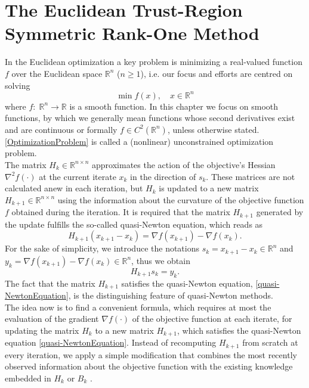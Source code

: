 \chapter{The Euclidean Trust-Region Symmetric Rank-One Method}

In the Euclidean optimization a key problem is minimizing a real-valued function $f$ over the Euclidean space $\mathbb{R}^n$ ($n \geq 1$), i.e. our focus and efforts are centred on solving 
\begin{equation}\label{OptimizationProblem}
    \min f(x), \quad x \in \mathbb{R}^n
\end{equation}  
where $f \colon \; \mathbb{R}^n \to \mathbb{R}$ is a smooth function. In this chapter we focus on smooth functions, by which we generally mean functions whose second derivatives exist and are continuous or formally $f \in C^2(\mathbb{R}^n)$, unless otherwise stated. \cref{OptimizationProblem} is called a (nonlinear) unconstrained optimization problem. \\

The matrix $H_k \in \mathbb{R}^{n \times n}$ approximates the action of the objective's Hessian $\nabla^{2} f(\cdot)$ at the current iterate $x_k$ in the direction of $s_k$. These matrices are not calculated anew in each iteration, but $H_k$ is updated to a new matrix $H_{k+1} \in \mathbb{R}^{n \times n}$ using the information about the curvature of the objective function $f$ obtained during the iteration. It is required that the matrix $H_{k+1}$ generated by the update fulfills the so-called quasi-Newton equation, which reads as 
\begin{equation*}
    H_{k+1} (x_{k+1} - x_k) = \nabla f(x_{k+1}) - \nabla f(x_k).
\end{equation*}
For the sake of simplicity, we introduce the notations $s_k = x_{k+1} - x_k \in \mathbb{R}^n$ and $y_k = \nabla f(x_{k+1}) - \nabla f(x_k) \in \mathbb{R}^n$, thus we obtain
\begin{equation}\label{quasi-NewtonEquation}
    H_{k+1} s_k = y_k.
\end{equation}
The fact that the matrix $H_{k+1}$ satisfies the quasi-Newton equation, \cref{quasi-NewtonEquation}, is the distinguishing feature of quasi-Newton methods. \\
The idea now is to find a convenient formula, which requires at most the evaluation of the gradient $\nabla f(\cdot)$ of the objective function at each iterate, for updating the matrix $H_k$ to a new matrix $H_{k+1}$, which satisfies the quasi-Newton equation \cref{quasi-NewtonEquation}. Instead of recomputing $H_{k+1}$ from scratch at every iteration, we apply a simple modification that combines the most recently observed information about the objective function with the existing knowledge embedded in $H_k$ or $B_k$ \cite[p.~139]{NocedalWright:2006}. \\

